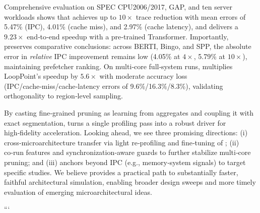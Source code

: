 Comprehensive evaluation on SPEC CPU2006/2017, GAP, and ten server workloads shows that \name achieves up to $10{\times}$ trace reduction with mean errors of 5.47\% (IPC), 4.01\% (cache miss), and 2.97\% (cache latency), and delivers a $9.23{\times}$ end‑to‑end speedup with a pre‑trained Transformer. Importantly, \name preserves comparative conclusions: across BERTI, Bingo, and SPP, the absolute error in \emph{relative} IPC improvement remains low (4.05\% at $4{\times}$, 5.79\% at $10{\times}$), maintaining prefetcher ranking. On multi‑core full‑system runs, \name multiplies LoopPoint’s speedup by $5.6{\times}$ with moderate accuracy loss (IPC/cache‑miss/cache‑latency errors of 9.6\%/16.3\%/8.3\%), validating orthogonality to region‑level sampling.

By casting fine‑grained pruning as learning from aggregates and coupling it with exact segmentation, \name turns a single profiling pass into a robust driver for high‑fidelity acceleration. Looking ahead, we see three promising directions: (i) cross‑microarchitecture transfer via light re‑profiling and fine‑tuning of \pts; (ii) co‑run \pts features and synchronization‑aware guards to further stabilize multi‑core pruning; and (iii) anchors beyond IPC (e.g., memory‑system signals) to target specific studies. We believe \name provides a practical path to substantially faster, faithful architectural simulation, enabling broader design sweeps and more timely evaluation of emerging microarchitectural ideas.



```

